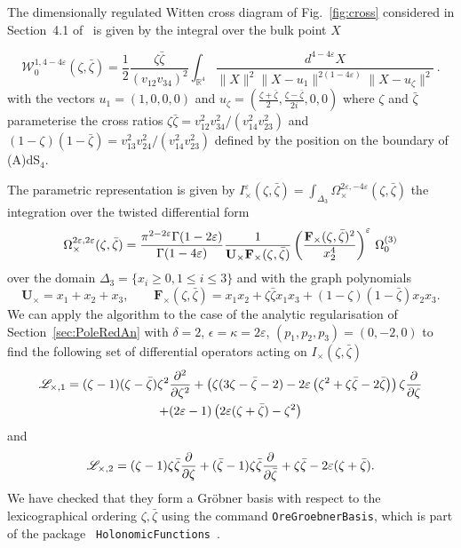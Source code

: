 \documentclass[a4paper,12pt]{article}
\numberwithin{equation}{section}
\numberwithin{figure}{section}
\begin{document}
The dimensionally regulated Witten cross diagram of Fig.~\ref{fig:cross} considered in
Section~4.1 of~\cite{Heckelbacher:2022fbx} is given by the integral
over the bulk point $X$

\begin{equation}
       \mathcal{ W}_0^{1,4-4\varepsilon}(\zeta,\bar\zeta)=\frac12\frac{\zeta\bar\zeta}{(v_{12}v_{34})^2}\int_{\mathbb{R}^4}\frac{d^{4-4\varepsilon}X}{\|X\|^2\|X-u_1\|^{2(1-4\varepsilon)}\|X-u_{\zeta}\|^2}\,.
\end{equation}
with the vectors  $u_1=(1,0,0,0)$ and 
$u_{\zeta}=\left(\frac{\zeta+\bar\zeta}{2},\frac{\zeta-\bar\zeta}{2i},0,0\right)$ where $\zeta$  and $\bar\zeta$ parameterise the cross ratios $\zeta\bar\zeta=v_{12}^2v_{34}^2/(v_{14}^2v_{23}^2)$ and
  $(1-\zeta)(1-\bar\zeta)=v_{13}^2v_{24}^2 /(v_{14}^2 v_{23}^2)$
  defined by the position on the boundary of (A)dS$_4$.

The parametric representation is given by
$
  I^\varepsilon_\times(\zeta,\bar\zeta)= \int_{\Delta_3}   \Omega_\times^{2\varepsilon,-4\varepsilon}(\zeta,\bar\zeta)
$ the integration over the twisted differential form
\begin{equation}
  \Omega_\times^{2\varepsilon,2\varepsilon}(\zeta,\bar\zeta)={\pi^{2-2\varepsilon}\Gamma(1-2\varepsilon)\over\Gamma(1-4\varepsilon)} {1\over \textbf{U}_\times
    \textbf{F}_\times (\zeta,\bar\zeta)} \left(
    \textbf{F}_\times (\zeta,\bar\zeta)^{2}\over  x_2^{4}\right)^\varepsilon  \, \Omega_0^{(3)}
\end{equation}
over the domain $\Delta_3=\{x_i\geq0, 1\leq i\leq 3\}$ and with the graph polynomials
\begin{equation}
  \textbf{U}_\times= x_1+x_2+x_3,  \qquad \textbf{F}_\times (\zeta,\bar\zeta)= x_1x_2+
  \zeta\bar\zeta x_1x_3+ (1-\zeta)(1-\bar\zeta)x_2x_3  .
\end{equation}
We can apply the algorithm to the case of the analytic regularisation
of Section~\ref{sec:PoleRedAn} 
with $\delta=2$, $\epsilon=\kappa=2\varepsilon$, $(p_1,p_2,p_3)=(0,-2,0)$
to find the following set of  differential operators
acting on $I_\times(\zeta,\bar\zeta)$
\begin{multline}
  \mathscr{L}_{\times,1}= (\zeta -1) (\zeta -\bar\zeta) \zeta ^2{\partial^2\over\partial\zeta^2}  +
   \left(\zeta (3 \zeta -\bar\zeta-2)-2\varepsilon  \left(\zeta ^2+\zeta 
   \bar\zeta-2 \bar\zeta\right) \right) \zeta {\partial\over\partial\zeta}\cr+(2 \varepsilon -1) \left(2 \varepsilon  (\zeta +\bar\zeta)-\zeta ^2\right)
\end{multline}
and
\begin{equation}
  \mathscr{L}_{\times,2}= (\zeta -1)\zeta\bar\zeta{\partial\over\partial\zeta}  +
   (\bar\zeta -1)\zeta\bar\zeta{\partial\over\partial\bar\zeta}+\zeta\bar\zeta-2\varepsilon(\zeta+\bar\zeta).
 \end{equation}
%
We have checked  that
they form a Gr\"obner basis with respect to the lexicographical
ordering $\zeta,\bar\zeta$ using 
the command {\tt OreGroebnerBasis}, which is part of the package {\tt
	HolonomicFunctions}~\cite{Koutchan}. 
\end{document}
